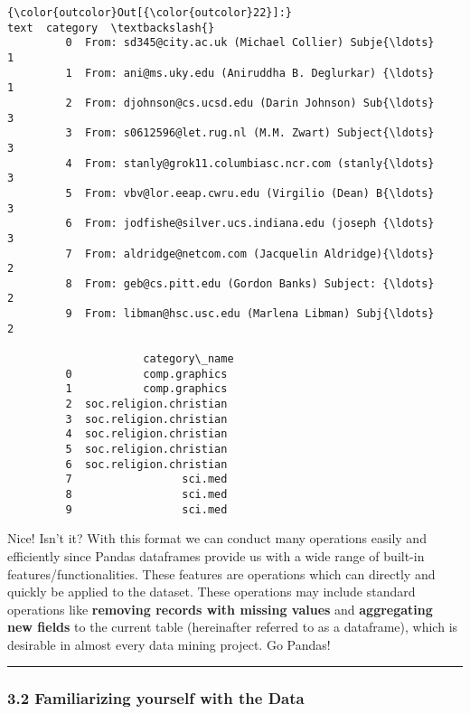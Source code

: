 \documentclass[11pt]{article}
\begin{document}
\begin{Verbatim}[commandchars=\\\{\}]
{\color{outcolor}Out[{\color{outcolor}22}]:}                                                 text  category  \textbackslash{}
         0  From: sd345@city.ac.uk (Michael Collier) Subje{\ldots}         1   
         1  From: ani@ms.uky.edu (Aniruddha B. Deglurkar) {\ldots}         1   
         2  From: djohnson@cs.ucsd.edu (Darin Johnson) Sub{\ldots}         3   
         3  From: s0612596@let.rug.nl (M.M. Zwart) Subject{\ldots}         3   
         4  From: stanly@grok11.columbiasc.ncr.com (stanly{\ldots}         3   
         5  From: vbv@lor.eeap.cwru.edu (Virgilio (Dean) B{\ldots}         3   
         6  From: jodfishe@silver.ucs.indiana.edu (joseph {\ldots}         3   
         7  From: aldridge@netcom.com (Jacquelin Aldridge){\ldots}         2   
         8  From: geb@cs.pitt.edu (Gordon Banks) Subject: {\ldots}         2   
         9  From: libman@hsc.usc.edu (Marlena Libman) Subj{\ldots}         2   
         
                     category\_name  
         0           comp.graphics  
         1           comp.graphics  
         2  soc.religion.christian  
         3  soc.religion.christian  
         4  soc.religion.christian  
         5  soc.religion.christian  
         6  soc.religion.christian  
         7                 sci.med  
         8                 sci.med  
         9                 sci.med  
\end{Verbatim}
            
    Nice! Isn't it? With this format we can conduct many operations easily
and efficiently since Pandas dataframes provide us with a wide range of
built-in features/functionalities. These features are operations which
can directly and quickly be applied to the dataset. These operations may
include standard operations like \textbf{removing records with missing
values} and \textbf{aggregating new fields} to the current table
(hereinafter referred to as a dataframe), which is desirable in almost
every data mining project. Go Pandas!

    \begin{center}\rule{0.5\linewidth}{\linethickness}\end{center}

    \hypertarget{familiarizing-yourself-with-the-data}{%
\subsubsection{3.2 Familiarizing yourself with the
Data}\label{familiarizing-yourself-with-the-data}}
\end{document}
